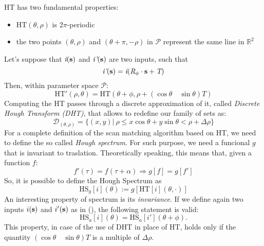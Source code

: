 \documentclass[a4paper, onecolumn]{report}
\begin{document}
HT has two fundamental properties:
\begin{itemize}
	\item{\mbox{HT}$(\theta, \rho)$ is 2$\pi$-periodic}
	\item{the two points $(\theta, \rho)$ and $(\theta+\pi, -\rho)$ in $\mathcal{P}$ represent the same line in $\mathbb{R}^2$}
\end{itemize}
Let's suppose that $\emph{i}(\bf{s})$ and $\emph{i'}(\bf{s})$ are two inputs, such that
\begin{equation}
	\emph{i'}(\bf{s}) = \emph{i}(\emph{R}_\phi \cdot \bf{s} + \emph{T})
\end{equation}
Then, within parameter space $\mathcal{P}$:
\begin{equation}
	\mbox{HT}'(\rho, \theta) = \mbox{HT}(\theta+\phi, \rho+(\cos\theta \quad \sin\theta)T)
\end{equation}
Computing the HT passes through a discrete approximation of it, called \emph{Discrete Hough Transform (DHT)}, that allows to redefine our family of sets as:
\begin{equation}
	\mathcal{D}_{(\theta, \rho)} = \{(x,y) | \ \rho\le x\cos\theta + y\sin\theta < \rho + \Delta\rho\} 
\end{equation}
For a complete definition of the scan matching algorithm based on HT, we need to define the so called \emph{Hough spectrum}. For such purpose, we need a funcional $g$ that is invariant to traslation. Theoretically speaking, this means that, given a function $f$:
\begin{equation}
	f'(\tau) = f(\tau + \alpha) \Rightarrow g[f] = g[f']
\end{equation}
So, it is possible to define the Hough Spectrum as
\begin{equation}
	\mbox{HS}_g[i](\theta) := g[\mbox{HT}[i](\theta, \cdot)]
\end{equation}
An interesting property of spectrum is its \emph{invariance}. If we define again two inputs $i(\bf{s})$ and $i'(\bf{s})$ as in (), the following statement is valid:
\begin{equation}
	\mbox{HS}_a[i](\theta) = \mbox{HS}_a[i'](\theta + \phi).
\end{equation}
This property, in case of the use of DHT in place of HT, holds only if the quantity $(\cos \theta \quad \sin \theta)T$ is a multiple of $\Delta\rho$.
\end{document}
